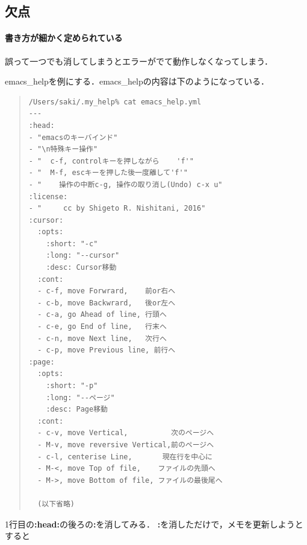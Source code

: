\subsection{欠点}

\paragraph{書き方が細かく定められている}
\begin{description}
\item 誤って一つでも消してしまうとエラーがでて動作しなくなってしまう．
\item emacs\_helpを例にする．emacs\_helpの内容は下のようになっている．
\\
\end{description}
\begin{quote}\begin{verbatim}
/Users/saki/.my_help% cat emacs_help.yml
---
:head:
- "emacsのキーバインド"
- "\n特殊キー操作"
- "  c-f, controlキーを押しながら    'f'"
- "  M-f, escキーを押した後一度離して'f'"
- "    操作の中断c-g, 操作の取り消し(Undo) c-x u"
:license:
- "     cc by Shigeto R. Nishitani, 2016"
:cursor:
  :opts:
    :short: "-c"
    :long: "--cursor"
    :desc: Cursor移動
  :cont:
  - c-f, move Forwrard,    前or右へ
  - c-b, move Backwrard,   後or左へ
  - c-a, go Ahead of line, 行頭へ
  - c-e, go End of line,   行末へ
  - c-n, move Next line,   次行へ
  - c-p, move Previous line, 前行へ
:page:
  :opts:
    :short: "-p"
    :long: "--ページ"
    :desc: Page移動
  :cont:
  - c-v, move Vertical,          次のページへ
  - M-v, move reversive Vertical,前のページへ
  - c-l, centerise Line,       現在行を中心に
  - M-<, move Top of file,    ファイルの先頭へ
  - M->, move Bottom of file, ファイルの最後尾へ
  
  (以下省略)
\end{verbatim}\end{quote}
\begin{description}
\item 1行目の\textbf{:head:}の後ろの\textbf{:}を消してみる．
\textbf{:}を消しただけで，メモを更新しようとすると
\end{description}
